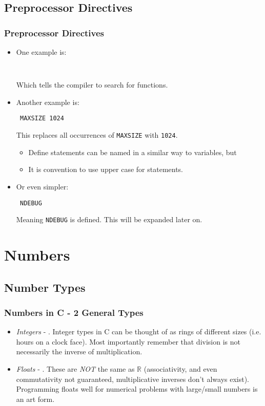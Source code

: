 \documentclass[smaller,table]{beamer} %
\begin{document}
\subsection{Preprocessor Directives}
\begin{frame}
\frametitle{Preprocessor Directives}
\begin{itemize}
\item One example is:
\begin{center}
\tt {} 
\end{center}
Which tells the compiler to search  for functions.
\item Another example is:
\begin{center}
\tt {} MAXSIZE 1024
\end{center}
This replaces all occurrences of {\tt MAXSIZE} with {\tt 1024}.
\begin{itemize}
\item Define statements can be named in a similar way to variables, but
\item It is convention to use upper case for  statements.
\end{itemize}
\item Or even simpler:
\begin{center}
\tt {} NDEBUG
\end{center}
Meaning {\tt NDEBUG} is defined. This will be expanded later on.
\end{itemize}
\end{frame}


\section{Numbers}
\subsection{Number Types}
\begin{frame}[fragile]
\frametitle{Numbers in C - 2 General Types}
\begin{itemize}
\item \emph{Integers} - . Integer types in C can be thought of as rings of different sizes (i.e. hours on a clock face). Most importantly remember that division is not necessarily the inverse of multiplication.
\item \emph{Floats} - .
These are \emph{NOT} the same as $\mathbb{R}$ (associativity, and even commutativity not guaranteed, multiplicative inverses don't always exist). Programming
floats well for numerical problems with large/small numbers is an art form.
\end{itemize}
\end{frame}
\end{document}
